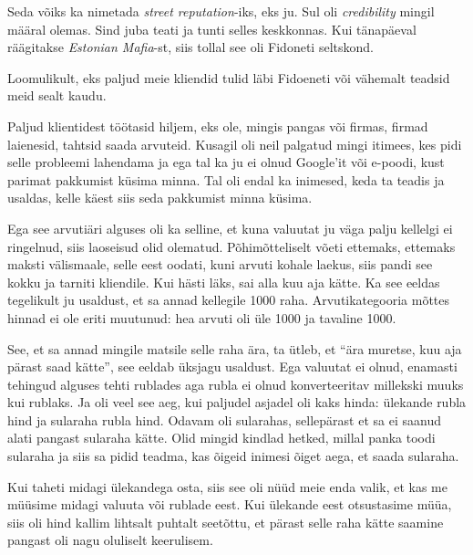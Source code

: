 
Seda võiks ka nimetada \emph{street reputation}-iks, eks ju. Sul oli 
\emph{credibility} mingil määral olemas. Sind juba teati ja tunti selles 
keskkonnas. Kui tänapäeval räägitakse \emph{Estonian Mafia}-st, siis tollal see 
oli Fidoneti seltskond.

Loomulikult, eks paljud meie kliendid tulid läbi Fidoeneti või vähemalt teadsid 
meid sealt kaudu.

Paljud klientidest töötasid hiljem, eks ole, mingis pangas või firmas, firmad 
laienesid, tahtsid saada arvuteid. Kusagil oli neil palgatud mingi itimees, 
kes pidi selle probleemi lahendama ja ega tal ka ju ei olnud Google'it või 
e-poodi, kust  parimat pakkumist küsima minna. Tal oli endal ka inimesed, keda 
ta teadis ja usaldas, kelle käest siis seda pakkumist minna küsima.
                 

Ega see arvutiäri alguses oli ka selline, et kuna valuutat 
ju väga palju kellelgi ei ringelnud, siis laoseisud olid olematud. 
Põhimõtteliselt võeti ettemaks, ettemaks maksti välismaale, selle eest oodati, 
kuni arvuti kohale laekus, siis pandi see kokku ja tarniti kliendile. Kui hästi 
läks, sai alla kuu aja kätte. Ka see eeldas tegelikult ju usaldust, et sa 
annad kellegile 1000 raha. Arvutikategooria mõttes 
hinnad ei ole eriti muutunud: hea arvuti oli üle 1000 ja tavaline 1000.

See, et sa annad mingile matsile selle raha ära, ta ütleb, et \enquote{ära 
muretse, kuu aja pärast saad kätte}, see eeldab üksjagu usaldust. Ega valuutat 
ei olnud, enamasti tehingud alguses tehti rublades aga rubla ei olnud 
konverteeritav millekski muuks kui rublaks. Ja oli veel see aeg, kui paljudel 
asjadel oli kaks hinda: ülekande rubla hind ja sularaha rubla hind. Odavam oli 
sularahas, sellepärast et sa ei saanud alati pangast sularaha kätte. Olid 
mingid kindlad hetked, millal panka toodi sularaha ja siis sa pidid teadma, kas 
õigeid inimesi õiget aega, et saada sularaha.


Kui taheti midagi ülekandega osta, siis see oli nüüd meie enda valik, et kas me 
müüsime midagi valuuta või rublade eest. Kui  ülekande eest otsustasime müüa, 
siis oli hind kallim lihtsalt puhtalt seetõttu, et pärast selle raha kätte 
saamine pangast oli nagu oluliselt keerulisem.

